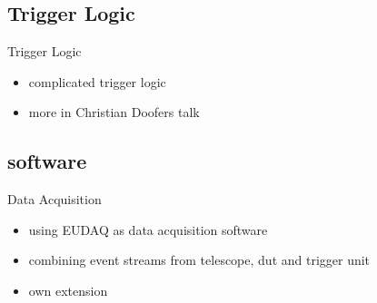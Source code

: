 \subsection{Trigger Logic}
\begin{frame}{Trigger Logic}
	\begin{itemize}
		\item complicated trigger logic
		\item more in Christian Doofers talk
	\end{itemize}
\end{frame}
\subsection{software}
\begin{frame}{Data Acquisition}
	\begin{itemize}
		\item using EUDAQ as data acquisition software
		\item combining event streams from telescope, dut and trigger unit
		\item own extension
	\end{itemize}
\end{frame}
